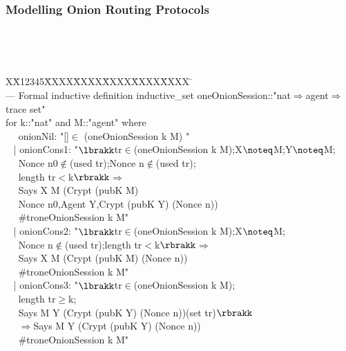 \documentclass{beamer}
\newlength{\fminilength}
\newenvironment{fmini}[1][\linewidth]
  {\setlength{\fminilength}{#1\fboxsep-2\fboxrule}%
   \vspace{2ex}\noindent\begin{lrbox}{\fminibox}\begin{minipage}{\fminilength}%
   \mbox{ }\hfill\vspace{-2.5ex}}%
  {\end{minipage}\end{lrbox}\vspace{1ex}\hspace{0ex}%
   \framebox{\usebox{\fminibox}}}
\newenvironment{specification}
{\noindent\scriptsize
\tt\begin{fmini}\begin{tabbing}X\=X12345\=XXXX\=XXXX\=XXXX\=XXXX\=XXXX
\=\+\kill} {\end{tabbing}\normalfont\end{fmini}}
\begin{document}
\begin{frame}\frametitle{Modelling Onion Routing Protocols}
\begin{specification}
\\ --- Formal inductive definition
inductive\_set oneOnionSession::"nat$\Rightarrow$agent$\Rightarrow$trace set"\\
for k::"nat" and M::"agent" where \\
~ ~onionNil: "[]$\in$ (oneOnionSession k M) " \\
~ | onionCons1: "$\lbrakk$tr$\in$(oneOnionSession k M);X$\noteq$M;Y$\noteq$M;\\
~~ Nonce n0$\notin$(used tr);Nonce n$\notin$(used tr); \\
~~ length tr$<$k$\rbrakk$$\Longrightarrow$ \\
~~ Says X M (Crypt (pubK M) \\
~~  \lbrace Nonce n0,Agent Y,Crypt (pubK Y) (Nonce n)\rbrace) \\
~~ \#tr\in oneOnionSession k M"\\
~ | onionCons2: "$\lbrakk$tr$\in$(oneOnionSession k M);X$\noteq$M; \\
~~ Nonce n$\notin$(used  tr);length tr$<$k$\rbrakk$$\Longrightarrow$\\
~~ Says X M (Crypt (pubK M) (Nonce n)) \\
~~ \#tr\in oneOnionSession k M"\\

~ | onionCons3: "$\lbrakk$tr$\in$(oneOnionSession k M);\\
~~ length tr$\geq$k; \\
~~ Says M Y (Crypt (pubK Y) (Nonce n))\notin(set tr)$\rbrakk$\\
~~ $\Longrightarrow$Says M Y (Crypt (pubK Y) (Nonce n))\\
~~ \#tr\in oneOnionSession k M"
\end{specification}
\end{frame}
\end{document}
